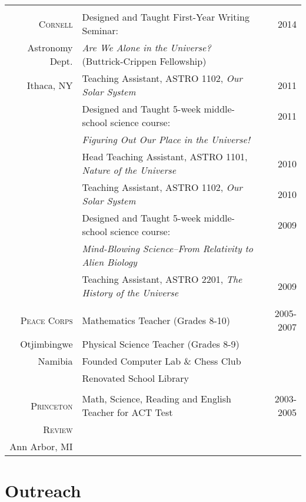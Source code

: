 \documentclass[10pt]{article} %
\begin{document}
{\begin{tabular}{>{\hfill}r|p{11.2cm}r}
\multicolumn{3}{c}{} \\
\textsc{Cornell} & Designed and Taught First-Year Writing Seminar: & 2014 \\
Astronomy Dept.& \hspace{0.25cm} {\it Are We Alone in the Universe?} (Buttrick-Crippen Fellowship) \\
Ithaca, NY & Teaching Assistant, ASTRO 1102, {\it Our Solar System} & 2011 \\
& Designed and Taught 5-week middle-school science course: & 2011\\
& \hspace{0.25cm} {\it Figuring Out Our Place in the Universe!} \\
& Head Teaching Assistant, ASTRO 1101, {\it Nature of the Universe} & 2010\\
& Teaching Assistant, ASTRO 1102, {\it Our Solar System} & 2010 \\
& Designed and Taught 5-week middle-school science course: & 2009\\
& \hspace{0.25cm} {\it Mind-Blowing Science--From Relativity to Alien Biology} \\
& Teaching Assistant, ASTRO 2201, {\it The History of the Universe} & 2009 \\
\multicolumn{3}{c}{} \\

\textsc{Peace Corps} & Mathematics Teacher (Grades 8-10) & 2005-2007\\
Otjimbingwe & Physical Science Teacher (Grades 8-9) \\
Namibia& Founded Computer Lab \& Chess Club \\
& Renovated School Library \\
\multicolumn{2}{c}{} \\

\textsc{Princeton} & Math, Science, Reading and English Teacher for ACT Test & 2003-2005\\
\textsc{Review} \\
Ann Arbor, MI
\end{tabular}


\section{Outreach}

}
\end{document}
